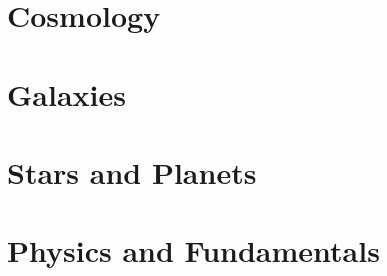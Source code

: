 \documentclass[a4paper,11pt, english]{report}
\begin{document}
\chapter{Cosmology}


\newpage\newpage
\chapter{Galaxies}


\newpage\newpage
\chapter{Stars and Planets}


\newpage\newpage
\chapter{Physics and Fundamentals}



\end{document}
